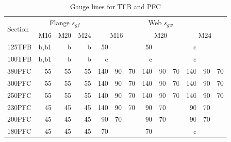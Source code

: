 \begin{table}[H]
\centering\footnotesize
\caption{Gauge lines for TFB and PFC}\label{tab:tfb_gauge}
\begin{minipage}{.8\linewidth}\centering
\begin{tabular}{l|rrr|rrr|rrr|rrr}
	\toprule
	\multirow{2}[0]{*}{Section} &                     \multicolumn{3}{c|}{Flange $s_{gf}$}                     &                       \multicolumn{9}{c}{Web $s_{gw}$}                        \\
	                            & \multicolumn{1}{c}{M16} & \multicolumn{1}{c}{M20} & \multicolumn{1}{c|}{M24} & \multicolumn{3}{c|}{M16} & \multicolumn{3}{c|}{M20} & \multicolumn{3}{c}{M24} \\ \midrule
	125TFB                      &                    b,b1 &                       b &                        b &  50 &    &               &  50 &    &               &   c &    &              \\
	100TFB                      &                    b,b1 &                       b &                        b &   c &    &               &   c &    &               &   c &    &              \\
	380PFC                      &                      55 &                      55 &                       55 & 140 & 90 &            70 & 140 & 90 &            70 & 140 & 90 &           70 \\
	300PFC                      &                      55 &                      55 &                       55 & 140 & 90 &            70 & 140 & 90 &            70 & 140 & 90 &           70 \\
	250PFC                      &                      55 &                      55 &                       55 & 140 & 90 &            70 & 140 & 90 &            70 & 140 & 90 &           70 \\
	230PFC                      &                      45 &                      45 &                       45 & 140 & 90 &            70 &  90 & 70 &               &  90 & 70 &              \\
	200PFC                      &                      45 &                      45 &                       45 &  90 & 70 &               &  90 & 70 &               &  90 & 70 &              \\
	180PFC                      &                      45 &                      45 &                       45 &  70 &    &               &  70 &    &               &   c &    &              \\

\end{tabular}
\end{minipage}
\end{table}
